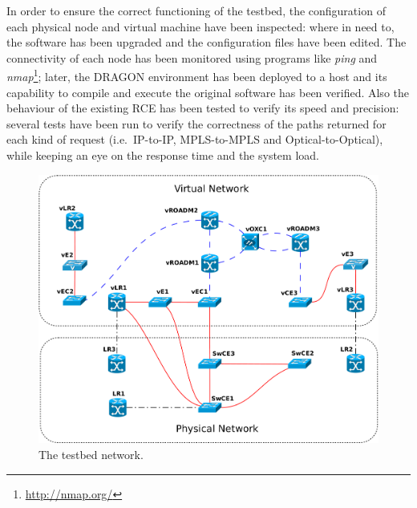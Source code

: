 \documentclass[10pt,a4paper]{report}
\begin{document}
In order to ensure the correct functioning of the testbed, the
configuration of each physical node and virtual machine have been
inspected: where in need to, the software has been upgraded and the
configuration files have been edited. The connectivity of each node
has been monitored using programs like \textit{ping} and
\textit{nmap}\footnote{\url{http://nmap.org/}}; later, the DRAGON
environment has been deployed to a host and its capability to compile
and execute the original software has been verified. Also the
behaviour of the existing RCE has been tested to verify its speed and
precision: several tests have been run to verify the correctness of
the paths returned for each kind of request (i.e.\ IP-to-IP,
MPLS-to-MPLS and Optical-to-Optical), while keeping an eye on the
response time and the system load.

\begin{figure}[!htbp]
  \begin{center}
    \includegraphics[width=1\textwidth]{img/testbed_model}
    \caption[Testbed model]{The testbed network.}
    \label{fig:testbed_model}
  \end{center}
\end{figure}
 
\end{document}
